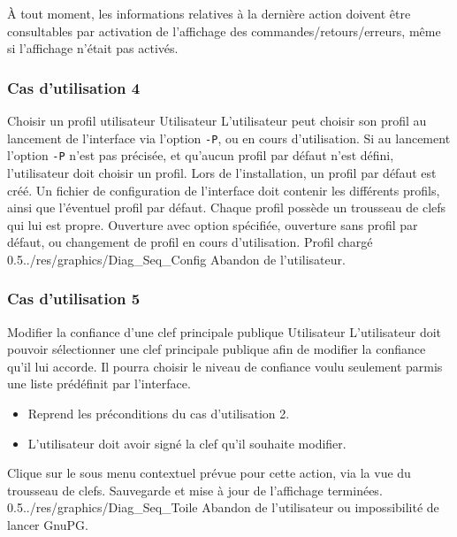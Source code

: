 \documentclass{../res/univ-projet}
\begin{document}
\`{A} tout moment, les informations relatives à la dernière action doivent être consultables par activation de l'affichage des commandes/retours/erreurs, même si l'affichage n'était pas activés.


\subsubsection{Cas d'utilisation 4}
\ficheGraphic
{Choisir un profil utilisateur}
{Utilisateur}
{L'utilisateur peut choisir son profil au lancement de l'interface via l'option \texttt{-P}, ou en cours d'utilisation. Si au lancement l'option \texttt{-P} n'est pas précisée, et qu'aucun profil par défaut n'est défini, l'utilisateur doit choisir un profil. Lors de l'installation, un profil par défaut est créé.}
{Un fichier de configuration de l'interface doit contenir les différents profils, ainsi que l'éventuel profil par défaut. 
Chaque profil possède un trousseau de clefs qui lui est propre.}
{Ouverture avec option spécifiée, ouverture sans profil par défaut, ou changement de profil en cours d'utilisation.}
{Profil chargé}
{0.5}{../res/graphics/Diag_Seq_Config}
{Abandon de l'utilisateur.}
\vspace{0.5cm}


\subsubsection{Cas d'utilisation 5}
\ficheGraphic
{Modifier la confiance d'une clef principale publique}         
{Utilisateur}
{L'utilisateur doit pouvoir sélectionner une clef principale publique afin de modifier la confiance qu'il lui accorde. 
Il pourra choisir le niveau de confiance voulu seulement parmis une liste prédéfinit par l'interface.
}
{
\begin{itemize}
 \item Reprend les préconditions du cas d'utilisation 2.
 \item L'utilisateur doit avoir signé la clef qu'il souhaite modifier.
\end{itemize}

}
{Clique sur le sous menu contextuel prévue pour cette action, via la vue du trousseau de clefs.}
{Sauvegarde et mise à jour de l'affichage terminées.}
{0.5}{../res/graphics/Diag_Seq_Toile}
{Abandon de l'utilisateur ou impossibilité de lancer GnuPG.}                      
\vspace{0.5cm}
  
\end{document}
